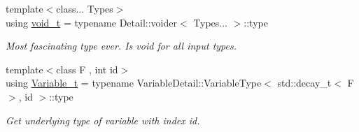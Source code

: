 \begin{DoxyCompactItemize}
{\footnotesize template$<$class... Types$>$ }\\using \hyperlink{namespaceFunG_a0cde667596590eb8d32e4a5ee76ddbb9}{void\+\_\+t} = typename Detail\+::voider$<$ Types... $>$\+::type
\begin{DoxyCompactList}\small\item\em Most fascinating type ever. Is void for all input types. \end{DoxyCompactList}\item 
{\footnotesize template$<$class F , int id$>$ }\\using \hyperlink{namespaceFunG_a1c6fc5c4c7cd6678b9de8962c14b86b5}{Variable\+\_\+t} = typename Variable\+Detail\+::\+Variable\+Type$<$ std\+::decay\+\_\+t$<$ F $>$, id $>$\+::type
\begin{DoxyCompactList}\small\item\em Get underlying type of variable with index id. \end{DoxyCompactList}\end{DoxyCompactItemize}
